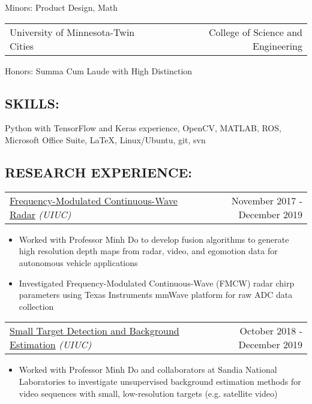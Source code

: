 \documentclass[10pt, letterpaper]{article}
\makeatletter
\newcommand{\headerrow}[2]
{\begin{tabular*}{\linewidth}{l@{\extracolsep{\fill}}r}
	#1 &
	#2 \\
\end{tabular*}}
\newcommand{\sansserif}{\cabin}
\makeatother
\begin{document}
Minors: Product Design, Math

\headerrow
	{University of Minnesota-Twin Cities}
	{College of Science and Engineering}

Honors: Summa Cum Laude with High Distinction

\subsection*{\sansserif SKILLS:}
Python with TensorFlow and Keras experience, OpenCV, MATLAB, ROS, 
	Microsoft Office Suite, \LaTeX, Linux/Ubuntu, git, svn

\begin{comment}
\subsection*{\sansserif RESEARCH INTERESTS:}
\begin{itemize}
	\item Efficient sensor fusion, particularly for autonomous vehicles
	\item Real-time video tracking and segmentation
	\item Intuitive exploitation of sequential nature of videos for perception tasks
\end{itemize}
\end{comment}


\subsection*{\sansserif RESEARCH EXPERIENCE:}

\headerrow
    {\uline{Frequency-Modulated Continuous-Wave Radar} \textit{(UIUC)}}
    {November 2017 - December 2019}
    \begin{itemize}
        \item
        Worked with Professor Minh Do to develop fusion algorithms to generate
		high resolution depth maps from radar, video, and egomotion data for autonomous vehicle applications
	\item 
		Investigated Frequency-Modulated Continuous-Wave (FMCW) radar
		    chirp parameters using Texas Instruments mmWave platform for
		    raw ADC data collection 
    \end{itemize}

\headerrow
	{\uline{Small Target Detection and Background Estimation} \textit{(UIUC)}}
	{October 2018 - December 2019}
	\begin{itemize}
		\item
			Worked with Professor Minh Do and collaborators at
			Sandia National Laboratories to investigate unsupervised
			background estimation methods for video sequences with
			small, low-resolution targets (e.g. satellite video)
	\end{itemize}
\end{document}
